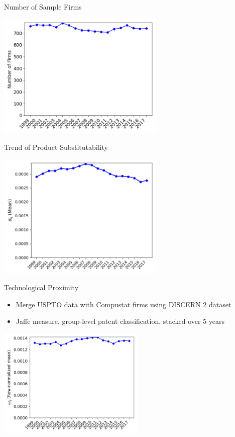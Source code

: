 \documentclass[
  10pt,
  aspectratio=169,   %
]{beamer}
\theoremstyle{plain}
\begin{document}
\begin{frame}{Number of Sample Firms}
  \begin{center}
    \includegraphics[width=8cm]{figures/number_of_firm}
  \end{center}
\end{frame}

\begin{frame}{Trend of Product Substitutability}
  \begin{center}
    \includegraphics[width=8cm]{figures/sigma}
  \end{center}
\end{frame}

\begin{frame}{Technological Proximity}
  \begin{itemize}
    \item Merge USPTO data with Compustat firms using DISCERN 2 dataset \citep{Arora2024-ad}
    \item Jaffe measure, group-level patent classification, stacked over 5 years
  \end{itemize}
  \begin{center}
    \includegraphics[width=7cm]{figures/omega}
  \end{center}
\end{frame}
\end{document}
